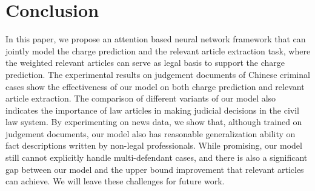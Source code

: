\section{Conclusion}
In this paper, we propose an attention based neural network framework that can jointly model the charge prediction and the relevant article extraction task, where the weighted relevant articles can serve as legal basis to support the charge prediction.
The experimental results on judgement documents of Chinese criminal cases show the effectiveness of our model on both charge prediction and relevant article extraction.
The comparison of different variants of our model also indicates the importance of law articles in making judicial decisions in the civil law system.
By experimenting on news data, we show that, although trained on judgement documents, our model also has reasonable generalization ability on fact descriptions written by non-legal professionals.
While promising, our model still cannot explicitly handle multi-defendant cases, and there is also a significant gap between our model and the upper bound improvement that relevant articles can achieve. We will leave these challenges for future work.


